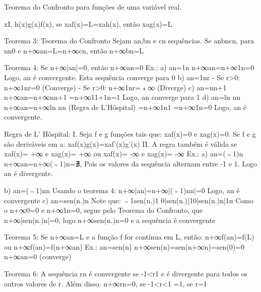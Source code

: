     Teorema do Confronto para funções de uma variável real.








        xI, h(x)g(x)f(x), se xaf(x)=L=xah(x), então xag(x)=L

    Teorema 3: Teorema do Confronto
        Sejam an,bn e cn sequências. Se anbncn, para nn0 e n+∞an=L=n+∞cn, então n+∞bn=L





    Teorema 4: 
        Se n+∞|an|=0, então n+∞an=0
        Ex.:
            a) an=1n
                n+∞an=n+∞1n=0
                Logo, an é convergente. Esta sequência converge para 0
            b) an=1nr
                - Se r>0: n+∞1nr=0 (Converge)
                - Se r>0: n+∞1nr=﹢∞ (Diverge)
            c) an=nn+1
                n+∞an=n+∞nn+1
                              =n+∞11+1n=1
                Logo, an converge para 1
            d) an=ln nn
                n+∞an=n+∞ln nn (Regra de L’Hôspital)
                              =n+∞1n1
                              =n+∞1n=0
                Logo, an é convergente.

    Regra de L’ Hôspital:
        I. Seja f e g funções tais que:
            xaf(x)=0 e xag(x)=0.
            Se f e g são deriváveis em a:
            xaf(x)g(x)=xaf'(x)g'(x)
        II. A regra também é válida se 
            xaf(x)= +∞ e xag(x)= +∞
            ou
            xaf(x)= -∞ e xag(x)= -∞
        Ex.:
            a) an=(﹣1)n
                n+∞an=n+∞(﹣1)n=∄, 
                Pois os valores da sequência alternam entre -1 e 1. Logo an é divergente.




             b) an=(﹣1)nn
	     Usando o teorema 4:
	     n+∞|an|=n+∞|(﹣1)nn|=0 
	     Logo, an é convergente
             c) an=sen(n.)n
                 Note que:
                 ﹣1sen(n.)1
                 0|sen(n.)|10|sen(n.)n|1n
                 Como o n+∞0=0 e n+∞1n=0, segue pelo Teorema do Confronto, que 
                 n+∞|sen(n.)n|=0, logo n+∞sen(n.)n=0 e a sequência é convergente

Teorema 5:
    Se n+∞an=L e a função f for contínua em L, então:
        n+∞f(an)=f(L) ou n+∞f(an)=f(n+∞an)
    Ex.: an=sen(n)
            n+∞sen(n)=sen(n+∞n)=sen(0)=0
            n+∞an=0 (converge)


Teorema 6:
    A sequência {rn} é convergente se -1<r1 e é divergente para todos os outros valores de r. Além disso:
    n+∞rn=0, se -1<r<1
                   =1, se r=1

